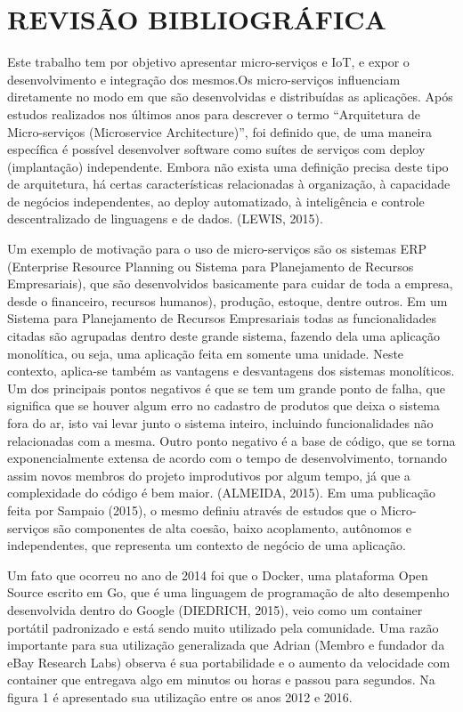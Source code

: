 \section{REVISÃO BIBLIOGRÁFICA}

Este trabalho tem por objetivo apresentar micro-serviços e IoT, e expor o desenvolvimento e integração dos mesmos.Os micro-serviços influenciam diretamente no modo em que são desenvolvidas e distribuídas as aplicações. Após estudos realizados nos últimos anos para descrever o termo “Arquitetura de Micro-serviços (Microservice Architecture)”, foi definido que, de uma maneira específica é possível desenvolver software como suítes de serviços com deploy (implantação) independente. Embora não exista uma definição precisa deste tipo de arquitetura, há certas características relacionadas à organização, à capacidade de negócios independentes, ao deploy automatizado, à inteligência e controle descentralizado de linguagens e de dados. (LEWIS, 2015).

Um exemplo de motivação para o uso de micro-serviços são os sistemas ERP (Enterprise Resource Planning ou Sistema para Planejamento de Recursos Empresariais), que são desenvolvidos basicamente para cuidar de toda a empresa, desde o financeiro, recursos humanos), produção, estoque, dentre outros. Em um Sistema para Planejamento de Recursos Empresariais todas as funcionalidades citadas são agrupadas dentro deste grande sistema, fazendo dela uma aplicação monolítica, ou seja, uma aplicação feita em somente uma unidade. Neste contexto, aplica-se também as vantagens e desvantagens dos sistemas monolíticos. Um dos principais pontos negativos é que se tem um grande ponto de falha, que significa que se houver algum erro no cadastro de produtos que deixa o sistema fora do ar, isto vai levar junto o sistema inteiro, incluindo funcionalidades não relacionadas com a mesma. Outro ponto negativo é a base de código, que se torna exponencialmente extensa de acordo com o tempo de desenvolvimento, tornando assim novos membros do projeto improdutivos por algum tempo, já que a complexidade do código é bem maior. (ALMEIDA, 2015). Em uma publicação feita por Sampaio (2015), o mesmo definiu através de estudos que o Micro-serviços são componentes de alta coesão, baixo acoplamento, autônomos e independentes, que representa um contexto de negócio de uma aplicação.

Um fato que ocorreu no ano de 2014 foi que o Docker, uma plataforma Open Source escrito em Go, que é uma linguagem de programação de alto desempenho desenvolvida dentro do Google (DIEDRICH, 2015), veio como um container portátil padronizado e está sendo muito utilizado pela comunidade. Uma razão importante para sua utilização generalizada que Adrian (Membro e fundador da eBay Research Labs)  observa é sua portabilidade e o aumento da velocidade com container que entregava algo em minutos ou horas e passou para segundos. Na figura 1 é apresentado sua utilização entre os anos 2012 e 2016.



